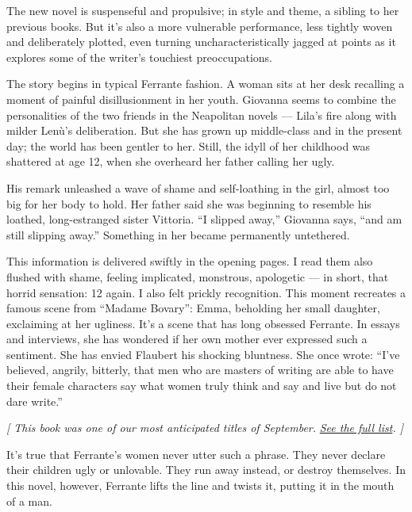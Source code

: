 The new novel is suspenseful and propulsive; in style and theme, a
sibling to her previous books. But it's also a more vulnerable
performance, less tightly woven and deliberately plotted, even turning
uncharacteristically jagged at points as it explores some of the
writer's touchiest preoccupations.

The story begins in typical Ferrante fashion. A woman sits at her desk
recalling a moment of painful disillusionment in her youth. Giovanna
seems to combine the personalities of the two friends in the Neapolitan
novels --- Lila's fire along with milder Lenù's deliberation. But she
has grown up middle-class and in the present day; the world has been
gentler to her. Still, the idyll of her childhood was shattered at age
12, when she overheard her father calling her ugly.

His remark unleashed a wave of shame and self-loathing in the girl,
almost too big for her body to hold. Her father said she was beginning
to resemble his loathed, long-estranged sister Vittoria. ``I slipped
away,'' Giovanna says, ``and am still slipping away.'' Something in her
became permanently untethered.

This information is delivered swiftly in the opening pages. I read them
also flushed with shame, feeling implicated, monstrous, apologetic ---
in short, that horrid sensation: 12 again. I also felt prickly
recognition. This moment recreates a famous scene from ``Madame
Bovary'': Emma, beholding her small daughter, exclaiming at her
ugliness. It's a scene that has long obsessed Ferrante. In essays and
interviews, she has wondered if her own mother ever expressed such a
sentiment. She has envied Flaubert his shocking bluntness. She once
wrote: ``I've believed, angrily, bitterly, that men who are masters of
writing are able to have their female characters say what women truly
think and say and live but do not dare write.''

\emph{{[} This book was one of our most anticipated titles of
September.}
\href{https://www.nytimes3xbfgragh.onion/2020/08/27/books/new-september-books.html}{\emph{See
the full list}}\emph{. {]}}

It's true that Ferrante's women never utter such a phrase. They never
declare their children ugly or unlovable. They run away instead, or
destroy themselves. In this novel, however, Ferrante lifts the line and
twists it, putting it in the mouth of a man.

